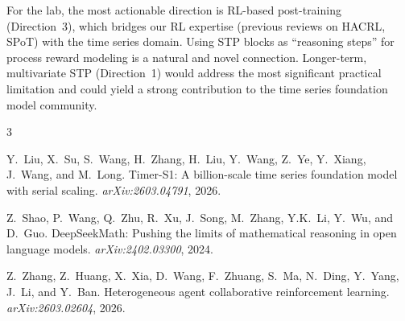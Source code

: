 \documentclass[11pt]{article}
\begin{document}
For the lab, the most actionable direction is RL-based post-training (Direction~3), which bridges our RL expertise (previous reviews on HACRL, SPoT) with the time series domain. Using STP blocks as ``reasoning steps'' for process reward modeling is a natural and novel connection. Longer-term, multivariate STP (Direction~1) would address the most significant practical limitation and could yield a strong contribution to the time series foundation model community.


\begin{thebibliography}{3}

Y.~Liu, X.~Su, S.~Wang, H.~Zhang, H.~Liu, Y.~Wang, Z.~Ye, Y.~Xiang, J.~Wang, and M.~Long.
\newblock Timer-S1: A billion-scale time series foundation model with serial scaling.
\newblock \emph{arXiv:2603.04791}, 2026.

Z.~Shao, P.~Wang, Q.~Zhu, R.~Xu, J.~Song, M.~Zhang, Y.K.~Li, Y.~Wu, and D.~Guo.
\newblock DeepSeekMath: Pushing the limits of mathematical reasoning in open language models.
\newblock \emph{arXiv:2402.03300}, 2024.

Z.~Zhang, Z.~Huang, X.~Xia, D.~Wang, F.~Zhuang, S.~Ma, N.~Ding, Y.~Yang, J.~Li, and Y.~Ban.
\newblock Heterogeneous agent collaborative reinforcement learning.
\newblock \emph{arXiv:2603.02604}, 2026.

\end{thebibliography}
\end{document}
